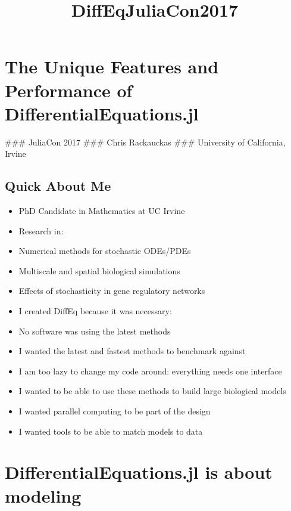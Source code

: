 \documentclass[11pt]{article}
\title{DiffEqJuliaCon2017}
\begin{document}
    
    
    \maketitle
    
    

    
    \section{The Unique Features and Performance of
DifferentialEquations.jl}\label{the-unique-features-and-performance-of-differentialequations.jl}

 \#\#\# JuliaCon 2017 \#\#\# Chris Rackauckas \#\#\# University of
California, Irvine

    \subsection{Quick About Me}\label{quick-about-me}

\begin{itemize}
\itemsep1pt\parskip0pt
\item
  PhD Candidate in Mathematics at UC Irvine
\item
  Research in:
\item
  Numerical methods for stochastic ODEs/PDEs
\item
  Multiscale and spatial biological simulations
\item
  Effects of stochasticity in gene regulatory networks
\item
  I created DiffEq because it was necessary:
\item
  No software was using the latest methods
\item
  I wanted the latest and fastest methods to benchmark against
\item
  I am too lazy to change my code around: everything needs one interface
\item
  I wanted to be able to use these methods to build large biological
  models
\item
  I wanted parallel computing to be part of the design
\item
  I wanted tools to be able to match models to data
\end{itemize}

    \section{DifferentialEquations.jl is about
modeling}\label{differentialequations.jl-is-about-modeling}
\end{document}
